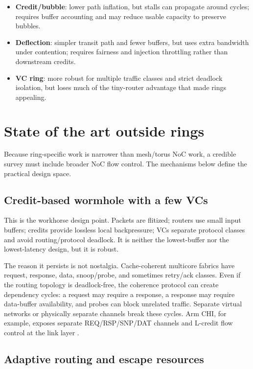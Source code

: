 \documentclass[11pt]{article}
\newcommand{\term}[1]{\textbf{#1}}
\begin{document}
\begin{itemize}
  \item \term{Credit/bubble}: lower path inflation, but stalls can propagate around cycles; requires buffer accounting and may reduce usable capacity to preserve bubbles.
  \item \term{Deflection}: simpler transit path and fewer buffers, but uses extra bandwidth under contention; requires fairness and injection throttling rather than downstream credits.
  \item \term{VC ring}: more robust for multiple traffic classes and strict deadlock isolation, but loses much of the tiny-router advantage that made rings appealing.
\end{itemize}

\section{State of the art outside rings}

Because ring-specific work is narrower than mesh/torus NoC work, a credible survey must include broader NoC flow control. The mechanisms below define the practical design space.

\subsection{Credit-based wormhole with a few VCs}

This is the workhorse design point. Packets are flitized; routers use small input buffers; credits provide lossless local backpressure; VCs separate protocol classes and avoid routing/protocol deadlock. It is neither the lowest-buffer nor the lowest-latency design, but it is robust.

The reason it persists is not nostalgia. Cache-coherent multicore fabrics have request, response, data, snoop/probe, and sometimes retry/ack classes. Even if the routing topology is deadlock-free, the coherence protocol can create dependency cycles: a request may require a response, a response may require data-buffer availability, and probes can block unrelated traffic. Separate virtual networks or physically separate channels break these cycles. Arm CHI, for example, exposes separate REQ/RSP/SNP/DAT channels and L-credit flow control at the link layer \cite{ArmCHI2021}.

\subsection{Adaptive routing and escape resources}
\end{document}
